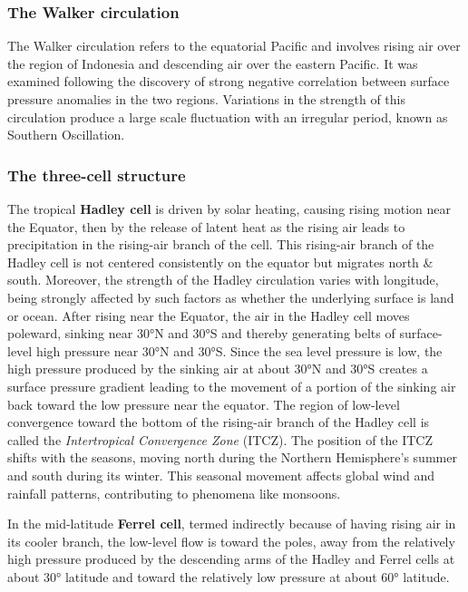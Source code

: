 \subsubsection{The Walker circulation}\label{subsubsec:walker-circulation}
The Walker circulation refers to the equatorial Pacific and involves rising air over the region of Indonesia and descending air over the eastern Pacific. It was examined following the discovery of strong negative correlation between surface pressure anomalies in the two regions.
Variations in the strength of this circulation produce a large scale fluctuation with an irregular period, known as Southern Oscillation.

\subsubsection{The three-cell structure}\label{subsubsec:three-cell-struct}

The tropical \textbf{Hadley cell} is driven by solar heating, causing rising motion near the Equator, then by the release of latent heat as the rising air leads to precipitation in the rising-air branch of the cell. This rising-air branch of the Hadley cell is not centered consistently on the equator but migrates north \& south.
Moreover, the strength of the Hadley circulation varies with longitude, being strongly affected by such factors as whether the underlying surface is land or ocean.
After rising near the Equator, the air in the Hadley cell moves poleward, sinking near \ang{30}N and \ang{30}S and thereby generating belts of surface-level high pressure near \ang{30}N and \ang{30}S.
Since the sea level pressure is low, the high pressure produced by the sinking air at about \ang{30}N and \ang{30}S creates a surface pressure gradient leading to the movement of a portion of the sinking air back toward the low pressure near the equator. The region of low-level convergence toward the bottom of the rising-air branch of the Hadley cell is called the \emph{Intertropical Convergence Zone} (ITCZ). The position of the ITCZ shifts with the seasons, moving north during the Northern Hemisphere’s summer and south during its winter. This seasonal movement affects global wind and rainfall patterns, contributing to phenomena like monsoons.

In the mid-latitude \textbf{Ferrel cell}, termed indirectly because of having rising air in its cooler branch, the low-level flow is toward the poles, away from the relatively high pressure produced by the descending arms of the Hadley and Ferrel cells at about \ang{30} latitude and toward the relatively low pressure at about \ang{60} latitude.

